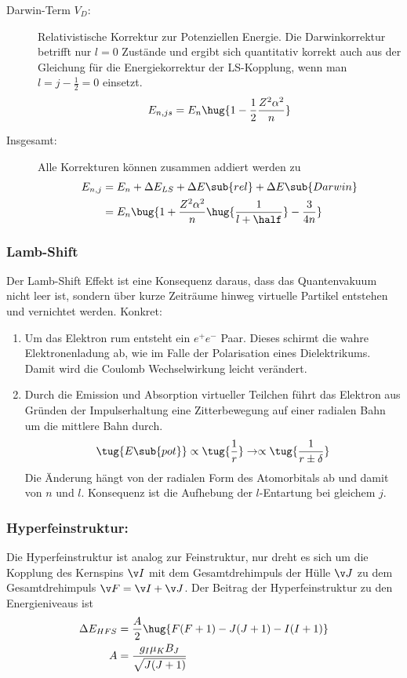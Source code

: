 \documentclass[twocolumn]{summery_4.1}
\begin{document}
\begin{description}
    \item[Darwin-Term \(V_D\):] Relativistische Korrektur zur Potenziellen Energie. Die Darwinkorrektur betrifft nur \(l=0\) Zustände und ergibt sich quantitativ korrekt auch aus der Gleichung für die Energiekorrektur der LS-Kopplung, wenn man \(l=j-\frac12 =0\) einsetzt.
    \begin{align*}
        E_{n,js} = E_n\hug{1 - \frac{1}{2}\frac{Z^2\alpha^2}{n}}
    \end{align*}

    \item[Insgesamt:] Alle Korrekturen können zusammen addiert werden zu 
    \begin{align*}
        E_{n,j} &= E_n + \Delta E_{LS} + \Delta E\sub{rel} + \Delta E\sub{Darwin}\\ 
        &= E_n \bug{1 + \frac{Z^2 \alpha^2}{n} \hug{\frac{1}{l + \half}}- \frac{3}{4n}}
    \end{align*}
\end{description}

\subsubsection{Lamb-Shift}
Der Lamb-Shift Effekt ist eine Konsequenz daraus, dass das Quantenvakuum nicht leer ist, sondern über kurze Zeiträume hinweg virtuelle Partikel entstehen und vernichtet werden. 
Konkret:
\begin{enumerate}
    \item Um das Elektron rum entsteht ein \(e^+ e^-\) Paar. Dieses schirmt die wahre Elektronenladung ab, wie im Falle der Polarisation eines Dielektrikums. Damit wird die Coulomb Wechselwirkung leicht verändert.
    \item Durch die Emission und Absorption virtueller Teilchen führt das Elektron aus Gründen der Impulserhaltung eine Zitterbewegung auf einer radialen Bahn um die mittlere Bahn durch. 
    \begin{align*}
        \tug{E\sub{pot}} \propto \tug{\frac1{r}} \to \propto \tug{\frac{1}{r\pm\delta}}
    \end{align*}
    Die Änderung hängt von der radialen Form des Atomorbitals ab und damit von $n$ und $l$. Konsequenz ist die Aufhebung der \(l\)-Entartung bei gleichem \(j\). 
\end{enumerate}

\subsubsection{Hyperfeinstruktur:}
Die Hyperfeinstruktur ist analog zur Feinstruktur, nur dreht es sich um die Kopplung des Kernspins \(\v I\) mit dem Gesamtdrehimpuls der Hülle \(\v J\) zu dem Gesamtdrehimpuls \(\v F = \v I + \v J \).
Der Beitrag der Hyperfeinstruktur zu den Energieniveaus ist 
\begin{align*}
    \Delta E_{HFS} &= \frac A2 \hug{F(F+1) - J(J+1) - I(I+1)} \\
    A&=\frac{g_I \mu_K B_J}{\sqrt{J(J+1)}}
\end{align*}
\end{document}
